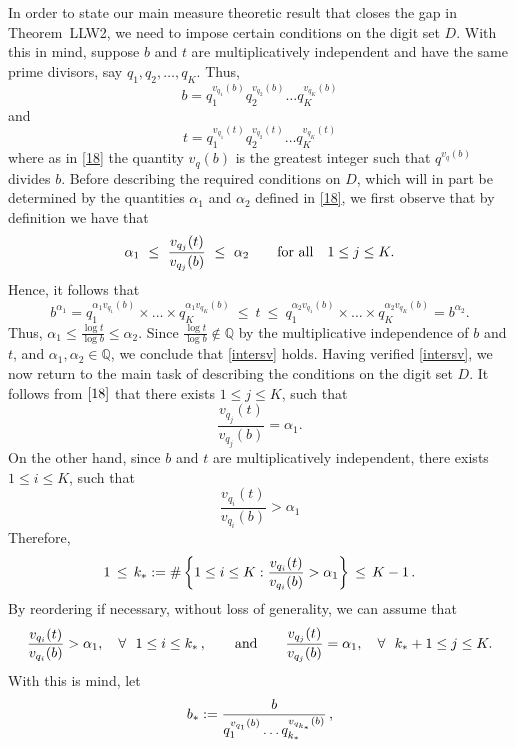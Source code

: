 \documentclass[12pt]{article}
\theoremstyle{definition}
\theoremstyle{remark}
\begin{document}
In order to state our main measure theoretic result that closes the gap  in Theorem~LLW2,  we need to impose certain conditions on the digit set $D$.
With this in mind,  suppose $b$ and $t$ are multiplicatively independent and have the same prime divisors, say $q_{1},q_{2},\ldots,q_{K}$. Thus,
$$b=q_{1}^{v_{q_{1}}(b)}q_{2}^{v_{q_{2}}(b)}\ldots q_{K}^{v_{q_{K}}(b)}$$
and
$$t=q_{1}^{v_{q_{1}}(t)}q_{2}^{v_{q_{2}}(t)}\ldots q_{K}^{v_{q_{K}}(t)}$$
where as in  \eqref{18}   the quantity $v_{q}(b)$ is the greatest integer such that $q^{v_{q}(b)}$ divides $b$.    Before describing the required  conditions on $D$, which will  in part be determined by  the quantities $\alpha_1$ and $\alpha_2$ defined in  \eqref{18},  we first observe  that by definition we have that 
$$\alpha_1   \ \le \ \frac{v_{q_{j}}(t)}{v_{q_{j}}(b)}  \ \le  \ \alpha_2\qquad {\rm for\ all}\quad 1\le j\le K.$$  Hence, it follows that
$$ b^{\alpha_1}=  q_{1}^{\alpha_1v_{q_{1}}(b)}\times\ldots\times q_{K}^{\alpha_1v_{q_{K}}(b)}    \ \le  \ t  \ \le \  q_{1}^{\alpha_2v_{q_{1}}(b)}\times\ldots\times q_{K}^{\alpha_2v_{q_{K}}(b)}=b^{\alpha_2}.$$ Thus,
$\alpha_1\le\frac{\log t}{\log b}\le\alpha_2 $. Since    $\frac{\log t}{\log b}\notin\mathbb{Q}$ by the multiplicative independence of $b$ and $t$,    and  $\alpha_1,\alpha_2\in\mathbb{Q}$, we conclude that    \eqref{intersv} holds. Having verified \eqref{intersv}, we now return to the main  task  of describing the conditions on the digit set
$D$.    It follows from $\eqref{18}$ that there exists $1\le j\le K$, such that 
$$\frac{v_{q_{j}}(t)}{v_{q_{j}}(b)}=\alpha_{1}.$$
On the other hand, since  $b$ and $t$ are multiplicatively independent, there exists $1\le i\le K$, such that
\begin{equation*}
\frac{v_{q_{i}}(t)}{v_{q_{i}}(b)}>\alpha_{1}%
\end{equation*}
Therefore, 
\begin{equation}\label{k_{*}}
1  \,  \le\,   k_{*}:=\#\left\{1\le i\le K: \frac{v_{q_{i}}(t)}{v_{q_{i}}(b)}>\alpha_{1}\right\}   \, \le  \, K-1  \, .  
\end{equation}
By reordering if necessary, without loss of generality,  we can assume that 
\begin{equation}\label{assumption}
 \frac{v_{q_{i}}(t)}{v_{q_{i}}(b)}>\alpha_{1},    \  \  \ \forall  \ \ 1\le i\le k_{*} \, , \qquad  {\rm and}\qquad \frac{v_{q_{j}}(t)}{v_{q_{j}}(b)}=\alpha_{1},   \ \ \ \forall\  \ k_{*}+1\le j\le K.
\end{equation}
With this is mind, let 
\begin{equation}\label{b_{*}}
b_{*}:=\frac{b}{q_{1}^{v_{q_{1}}(b)}\ldots q_{k_{*}}^{v_{q_{k_{*}}}(b)}}  \, , 
\end{equation}
\end{document}
